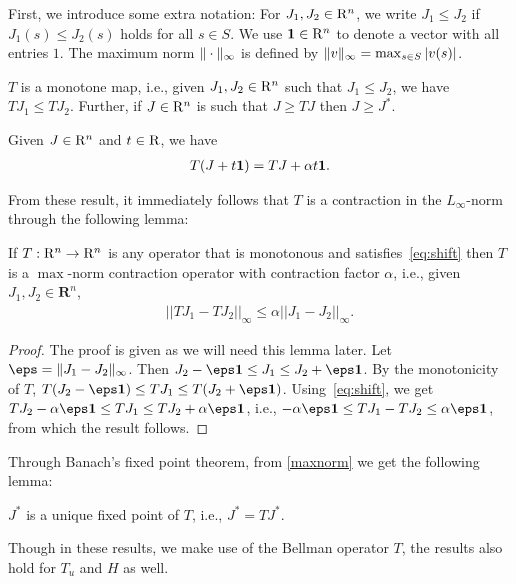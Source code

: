 First, we introduce some extra notation:
For $J_1,J_2\in \mathrm{R}^n$, we write $J_1\le J_2$ if $J_1(s)\le J_2(s)$ holds for all $s\in S$.
We use $\mathbf{1} \in \mathrm{R}^n$ to denote a vector with all entries $1$.
The maximum norm $\|\cdot\|_{\infty}$ is defined by $ \|v\|_{\infty} = \max_{s\in S} |v(s)|$.
\begin{lemma}\label{monotone}
$T$ is a monotone map, i.e., given $J_1,J_2 \in \mathrm{R}^n$ such that $J_1\leq J_2$, we have $T J_1\leq T J_2$. 
Further, if $J\in \mathrm{R}^n$ is such that $J\geq TJ$ then $J\geq J^*$. 
\end{lemma}
\begin{lemma}\label{shift}
Given $J\in \mathrm{R}^n$ and $t \in \mathrm{R}$, we have
\begin{align}\label{eq:shift}
T(J+t\one)=TJ+\alpha t\one.
\end{align}
\end{lemma}
From these result, it immediately follows that $T$ is a contraction in the $L_\infty$-norm through the following lemma:
\begin{lemma}\label{maxnorm}
If $T: \mathrm{R}^n \to \mathrm{R}^n$ is any operator that is monotonous and satisfies~\eqref{eq:shift} then 
$T$ is a $\max$-norm contraction operator with contraction factor $\alpha$, i.e., given $J_1, J_2 \in \mathbf{R}^n$,
\begin{align}
||TJ_1-TJ_2||_\infty\leq \alpha ||J_1-J_2||_\infty.
\end{align}
\end{lemma}
\begin{proof}
The proof is given as we will need this lemma later.
Let $\eps = \norm{J_1 - J_2}_\infty$. Then $J_2 - \eps \one \le J_1 \le J_2 + \eps \one$. By the monotonicity of $T$,
$T(J_2 - \eps \one) \le T J_1 \le T(J_2 + \eps \one)$. Using~\eqref{eq:shift}, we get 
$TJ_2 - \alpha \eps \one \le T J_1 \le TJ_2 + \alpha \eps \one$, i.e., $-\alpha \eps \one \le T J_1 - T J_2 \le \alpha \eps \one$, from which the result follows.
\end{proof}
Through Banach's fixed point theorem, from \cref{maxnorm} we get the following lemma:
\begin{lemma}\label{uniquesol} 
$J^*$ is a unique fixed point of $T$, i.e., $J^*=TJ^*$.
\end{lemma}
Though in these results, we make use of the Bellman operator $T$, the results also hold for $T_u$ and $H$ as well.

